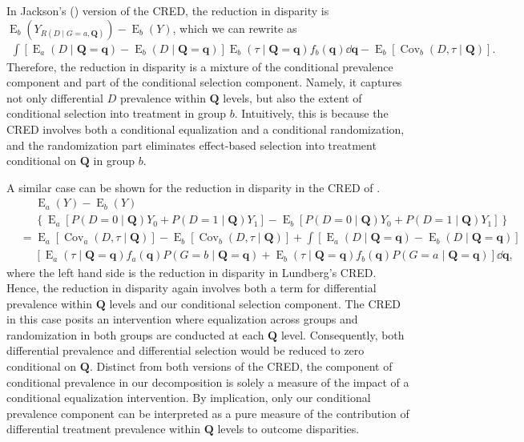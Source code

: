 \documentclass[12pt,a4paper]{article}
\newcommand{\Cov}{\operatorname{Cov}}
\newcommand{\E}{\operatorname{E}}
\def\Q{{\boldsymbol Q}}
\def\q{{\boldsymbol q}}
\begin{document}
In Jackson's (\citeyear{jackson_meaningful_2021}) version of the CRED, the reduction in disparity is $\E_b(Y_{R(D \mid G=a, \Q)})-\E_b(Y)$, which we can rewrite as 
\begin{gather}
\int  [\E_a(D \mid \Q=\q) - \E_b(D \mid \Q=\q)] \E_b(\tau \mid \Q=\q) f_b(\q) \dd \q - \E_b[\Cov_b(D, \tau \mid \Q)]. 
\end{gather}
Therefore, the reduction in disparity is a mixture of the conditional prevalence component and part of the conditional selection component. Namely, it captures not only differential $D$ prevalence within $\Q$ levels, but also the extent of conditional selection into treatment in group $b$. Intuitively, this is because the CRED involves both a conditional equalization and a conditional randomization, and the randomization part eliminates effect-based selection into treatment conditional on $\Q$ in group $b$. 

A similar case can be shown for the reduction in disparity in the CRED of \citet{lundberg_gap-closing_2022}.
\begin{align}
&\phantom{{}={}} \E_a(Y)-\E_b(Y) \nonumber \\ 
&\phantom{{}={}} \left\lbrace \E_a[P(D=0 \mid \Q) Y_0 + P(D=1 \mid \Q) Y_1] - \E_b[P(D=0 \mid \Q) Y_0 + P(D=1 \mid \Q) Y_1] \right\rbrace \nonumber \\
&= \E_a[\Cov_a(D,\tau \mid \Q)] - \E_b[\Cov_b(D,\tau \mid \Q)] + \int [\E_a(D \mid \Q=\q) - \E_b(D \mid \Q=\q)] \nonumber \\
&\phantom{{}={}} [\E_a(\tau \mid \Q=\q)f_a(\q)P(G=b \mid \Q=\q) + \E_b(\tau \mid \Q=\q)f_b(\q)P(G=a \mid \Q=\q)] \dd \q,
\end{align}
where the left hand side is the reduction in disparity in Lundberg's CRED. Hence, the reduction in disparity again involves both a term for differential prevalence within $\Q$ levels and our conditional selection component. The CRED in this case posits an intervention where equalization across groups and randomization in both groups are conducted at each $\Q$ level. Consequently, both differential prevalence and differential selection would be reduced to zero conditional on $\Q$. Distinct from both versions of the CRED, the component of conditional prevalence in our decomposition is solely a measure of the impact of a conditional equalization intervention. By implication, only our conditional prevalence component can be interpreted as a pure measure of the contribution of differential treatment prevalence within $\Q$ levels to  outcome disparities. 
\end{document}
